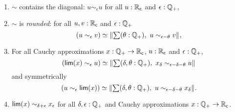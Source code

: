 \begin{lem}\label{RC-sim-uniformity-properties}
  \mbox{}
  \begin{enumerate}

  \item \label{RC-sim-diagonal}
    $\sim$ contains the diagonal:
    $u \sim_\epsilon u$ for all $u : \mathbb{R}_\mathsf{c}$ and $\epsilon : \mathbb{Q}_{+}$,

  \item \label{RC-sim-rounded}
    $\sim$ is \emph{rounded}:
    for all $u, v : \mathbb{R}_\mathsf{c}$ and $\epsilon : \mathbb{Q}_{+}$
    \begin{equation*}
      \eqv{
        (u \sim_\epsilon v)
      }{
        \brck{\sm{\theta : \Qp} u \sim_{\epsilon - \theta} v}
      },
    \end{equation*}


  \item \label{RC-sim-lim-rounded}
    For all Cauchy approximations $x : \mathbb{Q}_{+} \to \mathbb{R}_\mathsf{c}$, $u : \mathbb{R}_\mathsf{c}$ and $\epsilon : \mathbb{Q}_{+}$,
    \begin{equation*}
      \eqv{
        (\rclim(x) \sim_\epsilon u)
      }{
        \brck{\sm{\delta, \theta : \Qp} x_\delta \sim_{\epsilon - \delta - \theta} u}
      }
    \end{equation*}
    and symmetrically
    \begin{equation*}
      \eqv{
        (u \sim_\epsilon \rclim(x))
      }{
        \brck{\sm{\delta, \theta : \Qp} u \sim_{\epsilon - \delta - \theta} x_\delta}
      }.
    \end{equation*}
    
  \item \label{RC-sim-self}
    $\mathsf{lim}(x) \sim_{\delta + \epsilon} x_\epsilon$ for all $\delta, \epsilon : \mathbb{Q}_{+}$
    and Cauchy approximations $x : \mathbb{Q}_{+} \to \mathbb{R}_\mathsf{c}$.

  \end{enumerate}
\end{lem}

